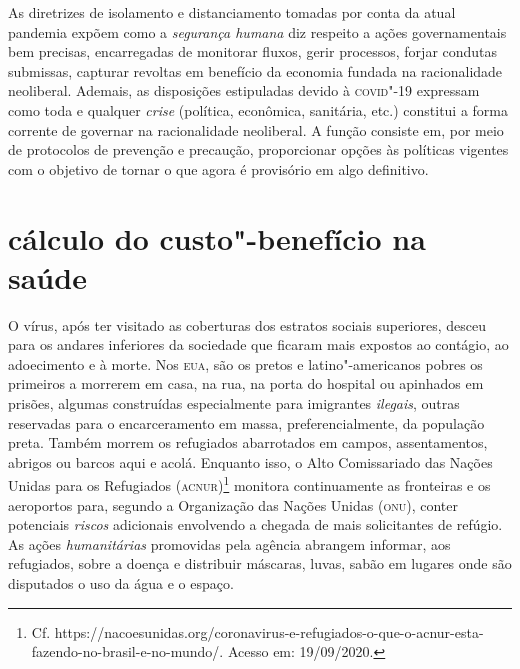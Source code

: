 As diretrizes de isolamento e distanciamento tomadas por conta da atual
pandemia expõem como a \emph{segurança humana} diz respeito a ações
governamentais bem precisas, encarregadas de monitorar fluxos, gerir
processos, forjar condutas submissas, capturar revoltas em benefício da
economia fundada na racionalidade neoliberal. Ademais, as disposições
estipuladas devido à \textsc{covid}"-19 expressam como toda e qualquer
\emph{crise} (política, econômica, sanitária, etc.) constitui a forma
corrente de governar na racionalidade neoliberal. A função consiste em,
por meio de protocolos de prevenção e precaução, proporcionar opções às
políticas vigentes com o objetivo de tornar o que agora é provisório em
algo definitivo.

\section{cálculo do custo"-benefício na saúde}

O vírus, após ter visitado as coberturas dos estratos sociais
superiores, desceu para os andares inferiores da sociedade que ficaram
mais expostos ao contágio, ao adoecimento e à morte. Nos \textsc{eua}, são os
pretos e latino"-americanos pobres os primeiros a morrerem em casa, na
rua, na porta do hospital ou apinhados em prisões, algumas construídas
especialmente para imigrantes \emph{ilegais}, outras reservadas para o
encarceramento em massa, preferencialmente, da população preta. Também
morrem os refugiados abarrotados em campos, assentamentos, abrigos ou
barcos aqui e acolá. Enquanto isso, o Alto Comissariado das Nações
Unidas para os Refugiados (\textsc{acnur})\footnote{Cf.
  https://nacoesunidas.org/coronavirus-e-refugiados-o-que-o-acnur-esta-fazendo-no-brasil-e-no-mundo/.
  Acesso em: 19/09/2020.} monitora continuamente as fronteiras e os
aeroportos para, segundo a Organização das Nações Unidas (\textsc{onu}), conter
potenciais \emph{riscos} adicionais envolvendo a chegada de mais
solicitantes de refúgio. As ações \emph{humanitárias} promovidas pela
agência abrangem informar, aos refugiados, sobre a doença e distribuir
máscaras, luvas, sabão em lugares onde são disputados o uso da água e o
espaço.

